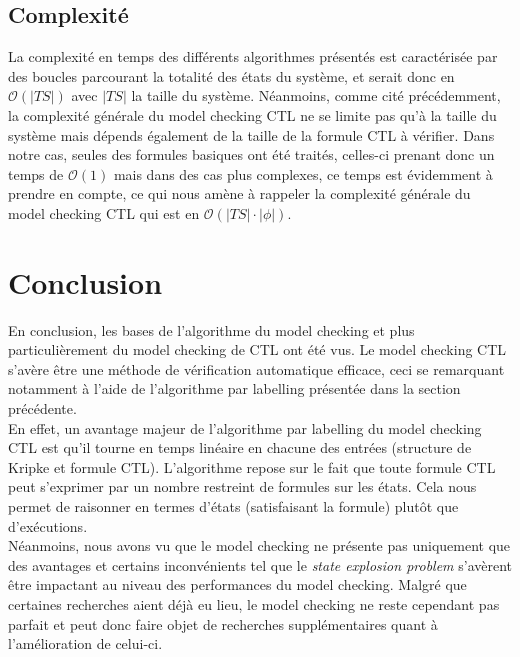 \documentclass[runningheads,a4paper,10pt]{llncs}
\begin{document}
\subsection{Complexité}

La complexité en temps des différents algorithmes présentés est caractérisée par des boucles parcourant la totalité des états du système, et serait donc en $\mathcal{O}(|TS|)$ avec $|TS|$ la taille du système. Néanmoins, comme cité précédemment, la complexité générale du model checking CTL ne se limite pas qu'à la taille du système mais dépends également de la taille de la formule CTL à vérifier. Dans notre cas, seules des formules basiques ont été traités, celles-ci prenant donc un temps de  $\mathcal{O}(1)$ mais dans des cas plus complexes, ce temps est évidemment à prendre en compte, ce qui nous amène à rappeler la complexité générale du model checking CTL qui est en $\mathcal{O}(|TS| \cdot |\phi|)$. \\


\section{Conclusion}

En conclusion, les bases de l'algorithme du model checking et plus particulièrement du model checking de CTL ont été vus. Le model checking CTL s'avère être une méthode de vérification automatique efficace, ceci se remarquant notamment à l'aide de l'algorithme par labelling présentée dans la section précédente. \\

En effet, un avantage majeur de l'algorithme par labelling du model checking CTL est qu'il tourne en temps linéaire en chacune des entrées (structure de Kripke et formule CTL). L’algorithme repose sur le fait que toute formule CTL peut s’exprimer par un nombre restreint de formules sur les états. Cela nous permet de raisonner en termes d'états (satisfaisant la formule) plutôt que d’exécutions. \\

Néanmoins, nous avons vu que le model checking ne présente pas uniquement que des avantages et certains inconvénients tel que le \textit{state explosion problem} s'avèrent être impactant au niveau des performances du model checking. Malgré que certaines recherches aient déjà eu lieu, le model checking ne reste cependant pas parfait et peut donc faire objet de recherches supplémentaires quant à l'amélioration de celui-ci. 
\end{document}
